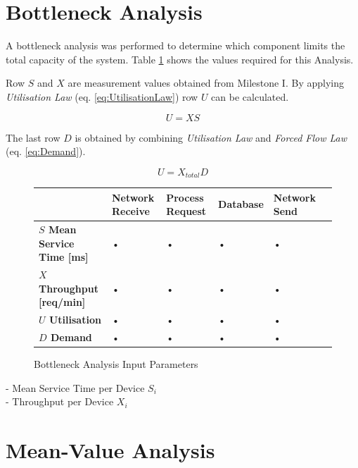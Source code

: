 \documentclass[a4paper]{article}
\begin{document}
\section{Bottleneck Analysis}

A bottleneck analysis was performed to determine which component limits the total capacity of the system. Table \ref{tabular:BottleneckParams} shows the values required for this Analysis.

Row $S$ and $X$ are measurement values obtained from Milestone I. By applying \textit{Utilisation Law} (eq. \ref{eq:UtilisationLaw}) row $U$ can be calculated.   

\begin{equation}
\label{eq:UtilisationLaw}
U = X S
\end{equation}


The last row $D$ is obtained by combining \textit{Utilisation Law} and \textit{Forced Flow Law} (eq. \ref{eq:Demand}). 

\begin{equation}
\label{eq:Demand}
U = X_{total} D
\end{equation}


\begin{figure}[H]
\label{tabular:BottleneckParams}
\begin{center}
\begin{tabular}{|l|l|l|l|l|l|}
\hline 
 & \textbf{Network Receive} & \textbf{Process Request} & \textbf{Database} & \textbf{Network Send}\\ 
\hline
\textbf{$S$ Mean Service Time [ms]} & • & • & • & • \\
\hline 
\textbf{$X$ Throughput [req/min]} & • & • & • & • \\
\hline
\textbf{$U$ Utilisation} & • & • & • & • \\
\hline
\textbf{$D$ Demand} & • & • & • & • \\
\hline
\end{tabular} 
\caption{Bottleneck Analysis Input Parameters}
\end{center}
\end{figure}


- Mean Service Time per Device $S_i$\\
- Throughput per Device $X_i$


\section{Mean-Value Analysis}
\end{document}
